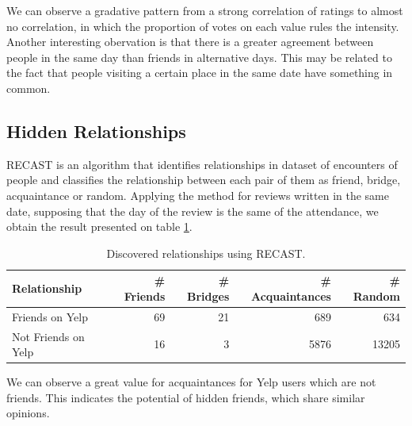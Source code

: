 We can observe a gradative pattern from a strong correlation of ratings to
almost no correlation, in which the proportion of votes on each value rules
the intensity. Another interesting obervation is that there is a greater
agreement between people in the same day than friends in alternative days. This
may be related to the fact that people visiting a certain place in the same date
have something in common.

\subsection{Hidden Relationships}
RECAST\cite{vaz2013recast} is an algorithm that identifies relationships in dataset of
encounters of people and classifies the relationship between each pair of them as
friend, bridge, acquaintance or
random. Applying the method for reviews written in the same date, supposing that the day of
the review is the same of the attendance, we obtain the result presented on
table \ref{tab:recast}.

\begin{table}[H]
\begin{tabular}{l|rrrr}
Relationship & \# Friends & \# Bridges & \# Acquaintances & \# Random \\ 
\hline
Friends on Yelp & 69 & 21 & 689 & 634 \\
Not Friends on Yelp & 16 & 3 & 5876 & 13205 \\
\end{tabular}
\caption{Discovered relationships using RECAST.}
\label{tab:recast}
\end{table}

We can observe a great value for acquaintances for Yelp users which are not
friends. This indicates the potential of hidden friends, which share similar
opinions.
